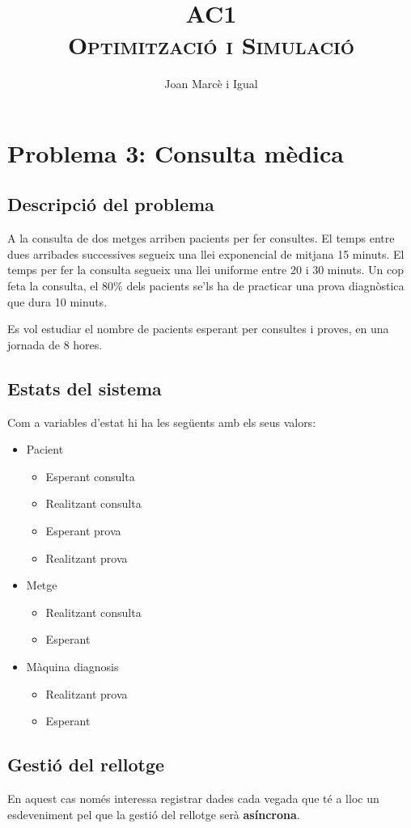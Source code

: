 \documentclass[a4paper]{article}
\title{AC1 \\ {\normalsize\textsc{Optimització i Simulació}}}
\author{Joan Marcè i Igual}
\date{}
\begin{document}
\maketitle

\section{Problema 3: Consulta mèdica}
\subsection{Descripció del problema}
A la consulta de dos metges arriben pacients per fer consultes. El temps entre dues arribades successives segueix una llei exponencial de mitjana 15 minuts. El temps per fer la consulta segueix una llei uniforme entre 20 i 30 minuts. Un cop feta la consulta, el 80\% dels pacients se’ls ha de practicar una prova diagnòstica que dura 10 minuts.

Es vol estudiar el nombre de pacients esperant per consultes i proves, en una jornada de 8 hores.

\subsection{Estats del sistema}
Com a variables d'estat hi ha les següents amb els seus valors:
\begin{itemize}
	\item Pacient
	\begin{itemize}
		\item Esperant consulta
		\item Realitzant consulta
		\item Esperant prova
		\item Realitzant prova
	\end{itemize}
	\item Metge
	\begin{itemize}
		\item Realitzant consulta
		\item Esperant
	\end{itemize}
	\item Màquina diagnosis	
	\begin{itemize}
		\item Realitzant prova
		\item Esperant
	\end{itemize}
\end{itemize}

\subsection{Gestió del rellotge}
En aquest cas només interessa registrar dades cada vegada que té a lloc un esdeveniment pel que la gestió del rellotge serà \textbf{asíncrona}.
\end{document}
